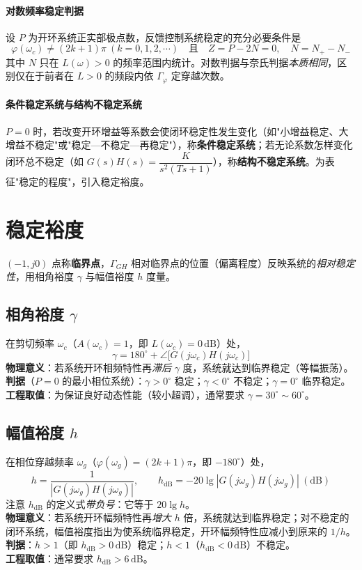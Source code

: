 \paragraph{对数频率稳定判据}
设 $P$ 为开环系统正实部极点数，反馈控制系统稳定的充分必要条件是
\[
\varphi(\omega_c)\neq(2k+1)\pi\ (k=0,1,2,\cdots)
\quad\text{且}\quad
Z=P-2N=0,\quad N=N_+-N_-
\]
其中 $N$ 只在 $L(\omega)>0$ 的频率范围内统计。对数判据与奈氏判据\emph{本质相同}，区别仅在于前者在 $L>0$ 的频段内依 $\Gamma_\varphi$ 定穿越次数。

\paragraph{条件稳定系统与结构不稳定系统}
$P=0$ 时，若改变开环增益等系数会使闭环稳定性发生变化（如"小增益稳定、大增益不稳定"或"稳定—不稳定—再稳定"），称\textbf{条件稳定系统}；若无论系数怎样变化闭环总不稳定（如 $G(s)H(s)=\dfrac{K}{s^2(Ts+1)}$），称\textbf{结构不稳定系统}。为表征"稳定的程度"，引入稳定裕度。

\bigskip

\section{稳定裕度}
$(-1,j0)$ 点称\textbf{临界点}，$\Gamma_{GH}$ 相对临界点的位置（偏离程度）反映系统的\emph{相对稳定性}，用相角裕度 $\gamma$ 与幅值裕度 $h$ 度量。

\subsection{相角裕度 $\gamma$}
在剪切频率 $\omega_c$（$A(\omega_c)=1$，即 $L(\omega_c)=0\,\mathrm{dB}$）处，
\[
\boxed{\ \gamma=180^\circ+\angle\big[G(j\omega_c)H(j\omega_c)\big]\ }
\]
\textbf{物理意义}：若系统开环相频特性再\emph{滞后} $\gamma$ 度，系统就达到临界稳定（等幅振荡）。\\
\textbf{判据}（$P=0$ 的最小相位系统）：$\gamma>0^\circ$ 稳定；$\gamma<0^\circ$ 不稳定；$\gamma=0^\circ$ 临界稳定。\\
\textbf{工程取值}：为保证良好动态性能（较小超调），通常要求 $\gamma=30^\circ\sim60^\circ$。

\subsection{幅值裕度 $h$}
在相位穿越频率 $\omega_g$（$\varphi(\omega_g)=(2k+1)\pi$，即 $-180^\circ$）处，
\[
h=\frac{1}{|G(j\omega_g)H(j\omega_g)|},\qquad
h_{\mathrm{dB}}=-20\lg|G(j\omega_g)H(j\omega_g)|\ (\mathrm{dB})
\]
注意 $h_{\mathrm{dB}}$ 的定义式\emph{带负号}：它等于 $20\lg h$。\\
\textbf{物理意义}：若系统开环幅频特性再\emph{增大} $h$ 倍，系统就达到临界稳定；对不稳定的闭环系统，幅值裕度指出为使系统临界稳定，开环幅频特性应减小到原来的 $1/h$。\\
\textbf{判据}：$h>1$（即 $h_{\mathrm{dB}}>0\,\mathrm{dB}$）稳定；$h<1$（$h_{\mathrm{dB}}<0\,\mathrm{dB}$）不稳定。\\
\textbf{工程取值}：通常要求 $h_{\mathrm{dB}}>6\,\mathrm{dB}$。

